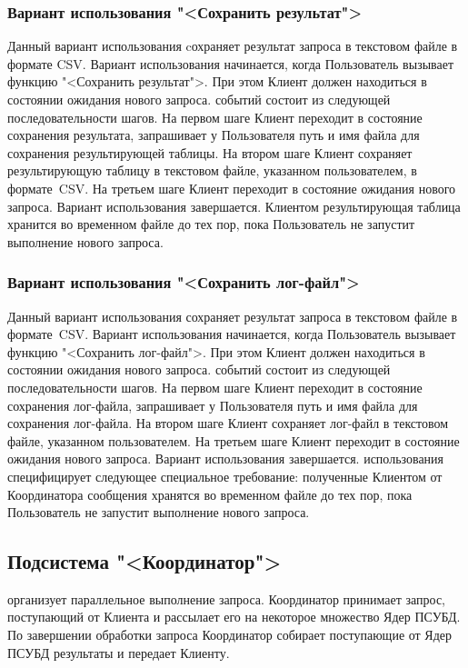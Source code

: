 \documentclass[11pt,oneside]{article}
\begin{document}
\subsubsection{Вариант использования "<Сохранить результат">}
Данный вариант использования cохраняет результат запроса в текстовом файле в формате CSV. Вариант использования начинается, когда Пользователь вызывает функцию "<Сохранить результат">. При этом Клиент должен находиться в состоянии ожидания нового запроса.
 событий состоит из следующей последовательности шагов. На первом шаге Клиент переходит в состояние сохранения результата, запрашивает у Пользователя путь и имя файла для сохранения результирующей таблицы. На втором шаге Клиент сохраняет результирующую таблицу в текстовом файле, указанном пользователем, в формате~CSV. На третьем шаге Клиент переходит в состояние ожидания нового запроса. Вариант использования завершается.
 Клиентом результирующая таблица хранится во временном файле до тех пор, пока Пользователь не запустит выполнение нового запроса.

\subsubsection{Вариант использования "<Сохранить лог-файл">}
Данный вариант использования сохраняет результат запроса в текстовом файле в формате~CSV. Вариант использования начинается, когда Пользователь вызывает функцию "<Сохранить лог-файл">. При этом Клиент должен находиться в состоянии ожидания нового запроса.
 событий состоит из следующей последовательности шагов. На первом шаге Клиент переходит в состояние сохранения лог-файла, запрашивает у Пользователя путь и имя файла для сохранения лог-файла. На втором шаге Клиент сохраняет лог-файл в текстовом файле, указанном пользователем. На третьем шаге Клиент переходит в состояние ожидания нового запроса. Вариант использования завершается.
 использования специфицирует следующее специальное требование: полученные Клиентом от Координатора сообщения хранятся во временном файле до тех пор, пока Пользователь не запустит выполнение нового запроса.

\subsection{Подсистема "<Координатор">}\label{S_Coordinator}
 организует параллельное выполнение запроса. Координатор принимает запрос, поступающий от Клиента и рассылает его на некоторое множество Ядер ПСУБД. По завершении обработки запроса Координатор собирает поступающие от Ядер ПСУБД результаты и передает Клиенту.
\end{document}
